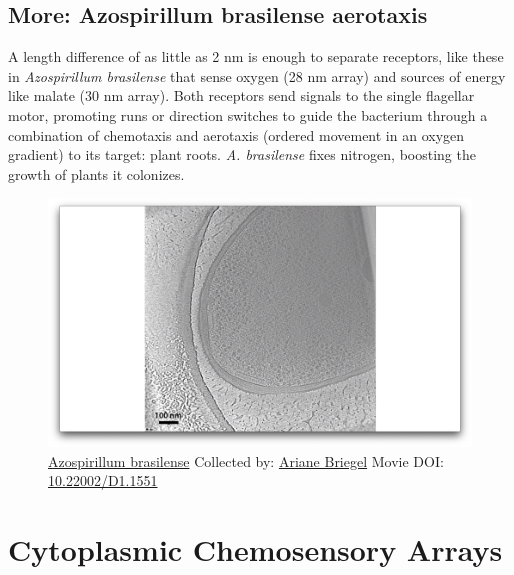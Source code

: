 \documentclass[]{tufte-book}
\begin{document}
\hypertarget{Azospirillum_brasilense_aerotaxis}{\subsection*{More:
Azospirillum brasilense
aerotaxis}\label{Azospirillum_brasilense_aerotaxis}}

A length difference of as little as 2 nm is enough to separate
receptors, like these in \emph{Azospirillum brasilense} that sense
oxygen (28 nm array) and sources of energy like malate (30 nm array).
Both receptors send signals to the single flagellar motor, promoting
runs or direction switches to guide the bacterium through a combination
of chemotaxis and aerotaxis (ordered movement in an oxygen gradient) to
its target: plant roots. \emph{A. brasilense} fixes nitrogen, boosting
the growth of plants it colonizes.





\begin{figure}
\includegraphics{movie_stills/7_4a} \caption[\protect\hyperlink{tree}{Azospirillum brasilense} Collected
by: \protect\hyperlink{ariane_briegel}{Ariane Briegel} Movie DOI:
\href{https://doi.org/10.22002/D1.1551}{10.22002/D1.1551}]{\protect\hyperlink{tree}{Azospirillum brasilense} Collected
by: \protect\hyperlink{ariane_briegel}{Ariane Briegel} Movie DOI:
\href{https://doi.org/10.22002/D1.1551}{10.22002/D1.1551}}\label{fig:7-4a}
\end{figure}

\section{Cytoplasmic Chemosensory
Arrays}\label{cytoplasmic-chemosensory-arrays}
\end{document}
